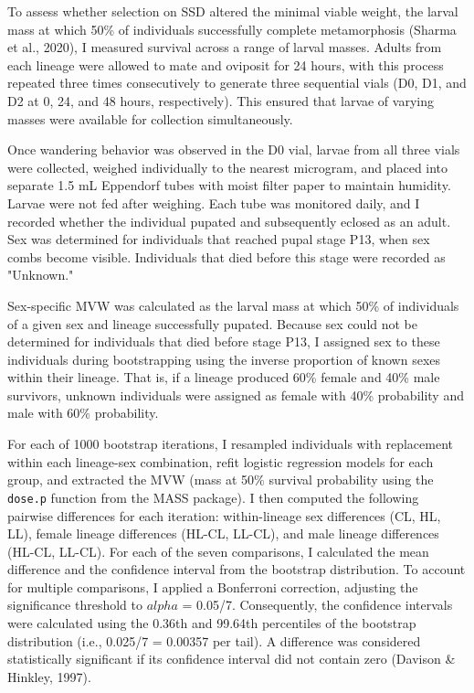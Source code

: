 \documentclass[12pt,reqno,oneside]{report}
\begin{document}
To assess whether selection on SSD altered the minimal viable weight, the larval mass at which 50\% of individuals successfully complete metamorphosis (Sharma et al., 2020), I measured survival across a range of larval masses. Adults from each lineage were allowed to mate and oviposit for 24 hours, with this process repeated three times consecutively to generate three sequential vials (D0, D1, and D2 at 0, 24, and 48 hours, respectively). This ensured that larvae of varying masses were available for collection simultaneously.

Once wandering behavior was observed in the D0 vial, larvae from all three vials were collected, weighed individually to the nearest microgram, and placed into separate 1.5 mL Eppendorf tubes with moist filter paper to maintain humidity. Larvae were not fed after weighing. Each tube was monitored daily, and I recorded whether the individual pupated and subsequently eclosed as an adult. Sex was determined for individuals that reached pupal stage P13, when sex combs become visible. Individuals that died before this stage were recorded as "Unknown."

Sex-specific MVW was calculated as the larval mass at which 50\% of individuals of a given sex and lineage successfully pupated. Because sex could not be determined for individuals that died before stage P13, I assigned sex to these individuals during bootstrapping using the inverse proportion of known sexes within their lineage. That is, if a lineage produced 60\% female and 40\% male survivors, unknown individuals were assigned as female with 40\% probability and male with 60\% probability.

For each of 1000 bootstrap iterations, I resampled individuals with replacement within each lineage-sex combination, refit logistic regression models for each group, and extracted the MVW (mass at 50\% survival probability using the \texttt{dose.p} function from the MASS package). I then computed the following pairwise differences for each iteration: within-lineage sex differences (CL, HL, LL), female lineage differences (HL-CL, LL-CL), and male lineage differences (HL-CL, LL-CL). For each of the seven comparisons, I calculated the mean difference and the confidence interval from the bootstrap distribution. To account for multiple comparisons, I applied a Bonferroni correction, adjusting the significance threshold to \(alpha\) = 0.05/7. Consequently, the confidence intervals were calculated using the 0.36th and 99.64th percentiles of the bootstrap distribution (i.e., 0.025/7 = 0.00357 per tail). A difference was considered statistically significant if its confidence interval did not contain zero (Davison \& Hinkley, 1997).
\end{document}
